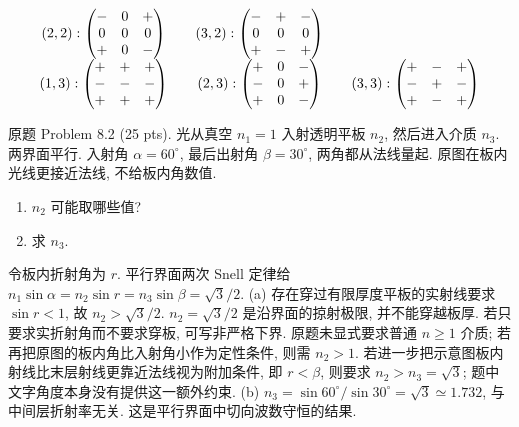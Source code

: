 \begin{solution}
\[\begin{array}{c@{\qquad}c@{\qquad}c}
(2,2):\begin{pmatrix}-&0&+\\0&0&0\\+&0&-\end{pmatrix}&
(3,2):\begin{pmatrix}-&+&-\\0&0&0\\+&-&+\end{pmatrix}\\[8pt]
(1,3):\begin{pmatrix}+&+&+\\-&-&-\\+&+&+\end{pmatrix}&
(2,3):\begin{pmatrix}+&0&-\\-&0&+\\+&0&-\end{pmatrix}&
(3,3):\begin{pmatrix}+&-&+\\-&+&-\\+&-&+\end{pmatrix}
\end{array}
\]
\end{solution}

\begin{exercise}\label{ps:8.2}
原题 Problem 8.2 (25 pts). 光从真空 $n_1=1$ 入射透明平板 $n_2$, 然后进入介质 $n_3$. 两界面平行. 入射角 $\alpha=60^\circ$, 最后出射角 $\beta=30^\circ$, 两角都从法线量起. 原图在板内光线更接近法线, 不给板内角数值.
\begin{enumerate}[label=\alph*.]
\item $n_2$ 可能取哪些值?
\item 求 $n_3$.
\end{enumerate}
\end{exercise}
\begin{solution}
令板内折射角为 $r$. 平行界面两次 Snell 定律给
$n_1\sin\alpha=n_2\sin r=n_3\sin\beta=\sqrt3/2$.
(a) 存在穿过有限厚度平板的实射线要求 $\sin r<1$, 故 $n_2>\sqrt3/2$. $n_2=\sqrt3/2$ 是沿界面的掠射极限, 并不能穿越板厚. 若只要求实折射角而不要求穿板, 可写非严格下界. 原题未显式要求普通 $n\ge1$ 介质; 若再把原图的板内角比入射角小作为定性条件, 则需 $n_2>1$. 若进一步把示意图板内射线比末层射线更靠近法线视为附加条件, 即 $r<\beta$, 则要求 $n_2>n_3=\sqrt3$; 题中文字角度本身没有提供这一额外约束.
(b) $n_3=\sin60^\circ/\sin30^\circ=\sqrt3\simeq1.732$, 与中间层折射率无关. 这是平行界面中切向波数守恒的结果.
\end{solution}

